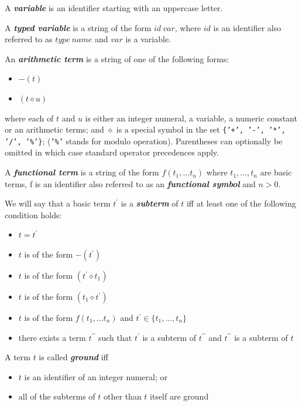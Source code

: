 \documentclass[a4paper,10pt]{article}
\begin{document}
A \textit{\textbf{variable}} is an identifier starting with an uppercase letter. 

A \textit{\textbf{typed variable}} is a string of the form $id~var$, where $id$ is an identifier also referred to as $type~name$ and $var$ is a variable.

An \textit{\textbf{arithmetic term}} is a string of one of the following forms: 
\begin{itemize}
\item  $-(t)$ 
\item $(t \diamond u)$
\end{itemize} 
where each of $t$ and $u$ is   either an integer numeral, a variable, a numeric constant  or an  arithmetic terms; and $\diamond$ is a special symbol in the set \texttt{\{'+', '-', '*', '/', '\%'\}}; (\texttt{'\%'} stands for modulo operation). Parentheses can optionally be omitted in which case standard operator precedences apply. 

A \textbf{\textit{functional term}} is a string of the form $f(t_1,\ldots t_n)$ where $t_1,\dots,t_n$ are basic terms, f  is an identifier also referred to as an \textit{\textbf{functional symbol}} and $n>0$. 

We will say that a basic term $t^\prime$ is a \textbf{\textit{subterm}} of $t$ iff at least one of the following condition holds:
\begin{itemize}
\item $t  = t^\prime$ 
\item $t$ is of the form $-(t^\prime)$
\item $t$ is of the form $(t^\prime \diamond t_1)$
\item $t$ is of the form $(t_1 \diamond t^\prime)$
\item $t$ is of the form $f(t_1,\ldots t_n)$ and $t^\prime \in \{t_1,\ldots,t_n\}$
\item there exists a term $t^{\prime\prime}$ such that $t^\prime$ is a subterm of  $t^{\prime\prime}$ and  $t^{\prime\prime}$ is a subterm of $t$
\end{itemize}

\noindent
A term $t$ is called \textbf{\textit{ground}} iff
\begin{itemize}
\item $t$ is an identifier of an integer numeral; or 
\item all of the subterms of $t$ other than $t$ itself  are ground 
\end{itemize}
\end{document}
